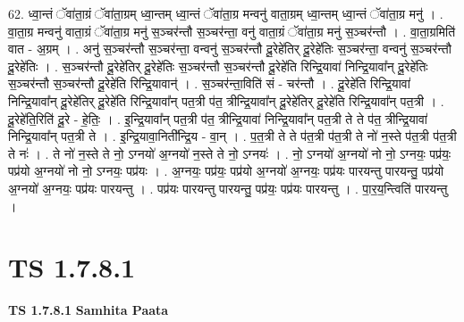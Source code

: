 \documentclass[17pt]{extarticle}
\begin{document}
62. ध्वा॒न्तं ॅवा॑ता॒ग्रं ॅवा॑ता॒ग्रम् ध्वा॒न्तम् ध्वा॒न्तं ॅवा॑ता॒ग्र मन्वनु॑ वाता॒ग्रम् ध्वा॒न्तम् ध्वा॒न्तं ॅवा॑ता॒ग्र मनु॑ । . वा॒ता॒ग्र मन्वनु॑ वाता॒ग्रं ॅवा॑ता॒ग्र मनु॑ स॒ञ्चर॑न्तौ स॒ञ्चर॑न्ता॒ वनु॑ वाता॒ग्रं ॅवा॑ता॒ग्र मनु॑ स॒ञ्चर॑न्तौ । . वा॒ता॒ग्रमिति॑ वात - अ॒ग्रम् । . अनु॑ स॒ञ्चर॑न्तौ स॒ञ्चर॑न्ता॒ वन्वनु॑ स॒ञ्चर॑न्तौ दू॒रेहे॑तिर् दू॒रेहे॑तिः स॒ञ्चर॑न्ता॒ वन्वनु॑ स॒ञ्चर॑न्तौ दू॒रेहे॑तिः । . स॒ञ्चर॑न्तौ दू॒रेहे॑तिर् दू॒रेहे॑तिः स॒ञ्चर॑न्तौ स॒ञ्चर॑न्तौ दू॒रेहे॑ति रिन्द्रि॒यावा॑ निन्द्रि॒यावा᳚न् दू॒रेहे॑तिः स॒ञ्चर॑न्तौ स॒ञ्चर॑न्तौ दू॒रेहे॑ति रिन्द्रि॒यावान्॑ । . स॒ञ्चर॑न्ता॒विति॑ सं - चर॑न्तौ । . दू॒रेहे॑ति रिन्द्रि॒यावा॑ निन्द्रि॒यावा᳚न् दू॒रेहे॑तिर् दू॒रेहे॑ति रिन्द्रि॒यावा᳚न् पत॒त्री प॑त॒ त्रीन्द्रि॒यावा᳚न् दू॒रेहे॑तिर् दू॒रेहे॑ति रिन्द्रि॒यावा᳚न् पत॒त्री । . दू॒रेहे॑ति॒रिति॑ दू॒रे - हे॒तिः॒ । . इ॒न्द्रि॒यावा᳚न् पत॒त्री प॑त॒ त्रीन्द्रि॒यावा॑ निन्द्रि॒यावा᳚न् पत॒त्री ते ते प॑त॒ त्रीन्द्रि॒यावा॑ निन्द्रि॒यावा᳚न् पत॒त्री ते । . इ॒न्द्रि॒यावा॒निती᳚न्द्रि॒य - वा॒न् । . प॒त॒त्री ते ते प॑त॒त्री प॑त॒त्री ते नो॑ न॒स्ते प॑त॒त्री प॑त॒त्री ते नः॑ । . ते नो॑ न॒स्ते ते नो॒ ऽग्नयो॑ अ॒ग्नयो॑ न॒स्ते ते नो॒ ऽग्नयः॑ । . नो॒ ऽग्नयो॑ अ॒ग्नयो॑ नो नो॒ ऽग्नयः॒ पप्र॑यः॒ पप्र॑यो अ॒ग्नयो॑ नो नो॒ ऽग्नयः॒ पप्र॑यः । . अ॒ग्नयः॒ पप्र॑यः॒ पप्र॑यो अ॒ग्नयो॑ अ॒ग्नयः॒ पप्र॑यः पारयन्तु पारयन्तु॒ पप्र॑यो अ॒ग्नयो॑ अ॒ग्नयः॒ पप्र॑यः पारयन्तु । . पप्र॑यः पारयन्तु पारयन्तु॒ पप्र॑यः॒ पप्र॑यः पारयन्तु । . पा॒र॒य॒न्त्विति॑ पारयन्तु । \newline
\pagebreak
{}
\section*{ TS 1.7.8.1 }

\textbf{TS 1.7.8.1 } \newline
\textbf{Samhita Paata} \newline
\end{document}
